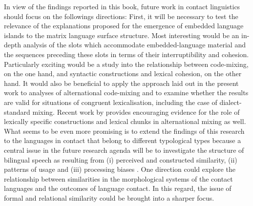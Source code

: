 In view of the findings reported in this book, future work in contact linguistics should focus on the followings directions: First, it will be necessary to test the relevance of the explanations proposed for the emergence of embedded language islands to the matrix language surface structure. Most interesting would be an in-depth analysis of the slots which accommodate embedded-language material and the sequences preceding these slots in terms of their interruptibility and cohesion. Particularly exciting would be a study into the relationship between code-mixing, on the one hand, and syntactic constructions and lexical cohesion, on the other hand. It would also be beneficial to apply the approach laid out in the present work to analyses of alternational code-mixing and to examine whether the results are valid for situations of congruent lexicalisation, including the case of dialect-standard mixing. Recent work by \citet{goria-units} provides encouraging evidence for the role of lexically specific constructions and lexical chunks in alternational mixing as well. What seems to be even more promising is to extend the findings of this research to the languages in contact that belong to different typological types because a central issue in the future research agenda will be to investigate the structure of bilingual speech as resulting from (i) perceived and constructed similarity, (ii) patterns of usage and (iii) processing biases \citep[see the papers in][]{hakimov-backus-20}. One direction could explore the relationship between similarities in the morphological systems of the contact languages and the outcomes of language contact. In this regard, the issue of formal and relational similarity could be brought into a sharper focus.